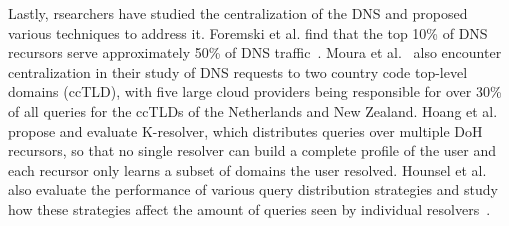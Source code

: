 Lastly, rsearchers have studied the centralization of the DNS and proposed various techniques to address it.
Foremski et al. find that the top 10\% of DNS recursors serve approximately 50\% of DNS traffic~\cite{foremski2019dns-observatory}.
Moura et al.~\cite{moura2020clouding} also encounter centralization in their study of DNS requests to two country code top-level domains (ccTLD), with five large cloud providers being responsible for over 30\% of all queries for the ccTLDs of the Netherlands and New Zealand.
Hoang et al.~\cite{hoang2020kresolver} propose and evaluate K-resolver, which distributes queries over multiple DoH recursors, so that no single resolver can build a complete profile of the user and each recursor only learns a subset of domains the user resolved.
Hounsel et al. also evaluate the performance of various query distribution strategies and study how these strategies affect the amount of queries seen by individual resolvers~\cite{hounsel2021multi}.
